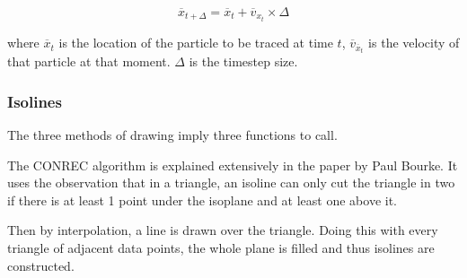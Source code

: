 \begin{displaymath}
  \overline{x}_{t+\Delta{}} = \overline{x}_t + \overline{v}_{x_t} \times{} \Delta{}
\end{displaymath}

where $\overline{x}_t$ is the location of the particle to be traced at time
$t$, $\overline{v}_{\overline{x}_t}$ is the velocity of that particle at that
moment. $\Delta{}$ is the timestep size.

\subsubsection{Isolines}

The three methods of drawing imply three functions to call.



The CONREC algorithm is explained extensively in the paper by Paul Bourke. It
uses the observation that in a triangle, an isoline can only cut the triangle
in two if there is at least 1 point under the isoplane and at least one above
it.

Then by interpolation, a line is drawn over the triangle. Doing this with every
triangle of adjacent data points, the whole plane is filled and thus isolines
are constructed.
